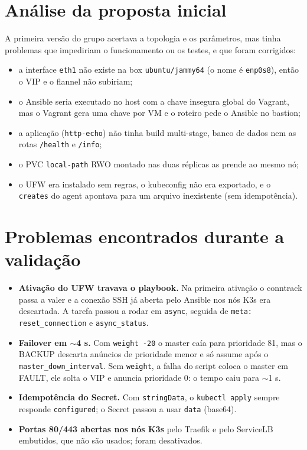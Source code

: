 \documentclass[11pt,a4paper]{article}
\begin{document}
\section{Análise da proposta inicial}
A primeira versão do grupo acertava a topologia e os parâmetros, mas tinha problemas que
impediriam o funcionamento ou os testes, e que foram corrigidos:
\begin{itemize}
\item a interface \texttt{eth1} não existe na box \texttt{ubuntu/jammy64} (o nome é
  \texttt{enp0s8}), então o VIP e o flannel não subiriam;
\item o Ansible seria executado no host com a chave insegura global do Vagrant, mas o
  Vagrant gera uma chave por VM e o roteiro pede o Ansible no bastion;
\item a aplicação (\texttt{http-echo}) não tinha build multi-stage, banco de dados nem as
  rotas \texttt{/health} e \texttt{/info};
\item o PVC \texttt{local-path} RWO montado nas duas réplicas as prende ao mesmo nó;
\item o UFW era instalado sem regras, o kubeconfig não era exportado, e o
  \texttt{creates} do agent apontava para um arquivo inexistente (sem idempotência).
\end{itemize}

\section{Problemas encontrados durante a validação}
\begin{itemize}
\item \textbf{Ativação do UFW travava o playbook.} Na primeira ativação o conntrack passa a
  valer e a conexão SSH já aberta pelo Ansible nos nós K3s era descartada. A tarefa passou
  a rodar em \texttt{async}, seguida de \texttt{meta: reset\_connection} e
  \texttt{async\_status}.
\item \textbf{Failover em $\sim$4 s.} Com \texttt{weight -20} o master caía para prioridade
  81, mas o BACKUP descarta anúncios de prioridade menor e só assume após o
  \texttt{master\_down\_interval}. Sem \texttt{weight}, a falha do script coloca o master
  em FAULT, ele solta o VIP e anuncia prioridade 0: o tempo caiu para $\sim$1 s.
\item \textbf{Idempotência do Secret.} Com \texttt{stringData}, o \texttt{kubectl apply}
  sempre responde \texttt{configured}; o Secret passou a usar \texttt{data} (base64).
\item \textbf{Portas 80/443 abertas nos nós K3s} pelo Traefik e pelo ServiceLB embutidos,
  que não são usados; foram desativados.
\end{itemize}
\end{document}
